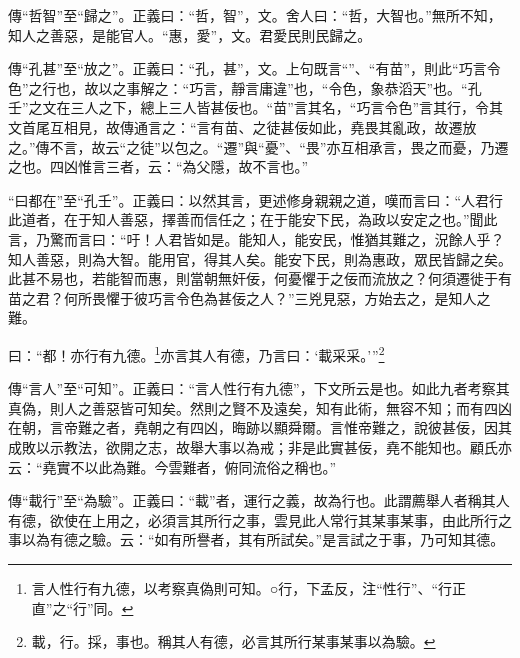 {\noindent\zhuan{}\fzbyks 傳“哲智”至“歸之”。正義曰：“哲，智”，文。舍人曰：“哲，大智也。”無所不知，知人之善惡，是能官人。“惠，愛”，文。君愛民則民歸之。 \par}

{\noindent\zhuan{}\fzbyks 傳“孔甚”至“放之”。正義曰：“孔，甚”，文。上句既言“”、“有苗”，則此“巧言令色”之行也，故以之事解之：“巧言，靜言庸違”也，“令色，象恭滔天”也。“孔壬”之文在三人之下，總上三人皆甚佞也。“苗”言其名，“巧言令色”言其行，令其文首尾互相見，故傳通言之：“言有苗、之徒甚佞如此，堯畏其亂政，故遷放之。”傳不言，故云“之徒”以包之。“遷”與“憂”、“畏”亦互相承言，畏之而憂，乃遷之也。四凶惟言三者，云：“為父隱，故不言也。” \par}

{\noindent\shu{}\fzkt “曰都在”至“孔壬”。正義曰：以然其言，更述修身親親之道，嘆而言曰：“人君行此道者，在于知人善惡，擇善而信任之；在于能安下民，為政以安定之也。”聞此言，乃驚而言曰：“吁！人君皆如是。能知人，能安民，惟猶其難之，況餘人乎？知人善惡，則為大智。能用官，得其人矣。能安下民，則為惠政，眾民皆歸之矣。此甚不易也，若能智而惠，則當朝無奸佞，何憂懼于之佞而流放之？何須遷徙于有苗之君？何所畏懼于彼巧言令色為甚佞之人？”三兇見惡，方始去之，是知人之難。 \par}

曰：“都！亦行有九德。\footnote{言人性行有九德，以考察真偽則可知。○行，下孟反，注“性行”、“行正直”之“行”同。}亦言其人有德，乃言曰：‘載采采。’”\footnote{載，行。採，事也。稱其人有德，必言其所行某事某事以為驗。}


{\noindent\zhuan{}\fzbyks 傳“言人”至“可知”。正義曰：“言人性行有九德”，下文所云是也。如此九者考察其真偽，則人之善惡皆可知矣。然則之賢不及遠矣，知有此術，無容不知；而有四凶在朝，言帝難之者，堯朝之有四凶，晦跡以顯舜爾。言惟帝難之，說彼甚佞，因其成敗以示教法，欲開之志，故舉大事以為戒；非是此實甚佞，堯不能知也。顧氏亦云：“堯實不以此為難。今雲難者，俯同流俗之稱也。” \par}

{\noindent\zhuan{}\fzbyks 傳“載行”至“為驗”。正義曰：“載”者，運行之義，故為行也。此謂薦舉人者稱其人有德，欲使在上用之，必須言其所行之事，雲見此人常行其某事某事，由此所行之事以為有德之驗。云：“如有所譽者，其有所試矣。”是言試之于事，乃可知其德。 \par}

